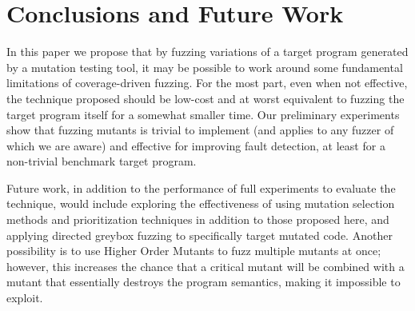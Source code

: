 \section{Conclusions and Future Work}

In this paper we propose that by fuzzing variations of a target program generated by a mutation testing tool, it may be possible to work around some fundamental limitations of coverage-driven fuzzing.  For the most part, even when not effective, the technique proposed should be low-cost and at worst equivalent to fuzzing the target program itself for a somewhat smaller time.  Our preliminary experiments show that fuzzing mutants is trivial to implement (and applies to any fuzzer of which we are aware) and effective for improving fault detection, at least for a non-trivial benchmark target program.

Future work, in addition to the performance of full experiments to evaluate the technique, would include exploring the effectiveness of using mutation selection methods and prioritization techniques in addition to those proposed here, and applying directed greybox fuzzing \cite{AFLGo} to specifically target mutated code.  Another possibility is to use Higher Order Mutants \cite{HOM} to fuzz multiple mutants at once; however, this increases the chance that a critical mutant will be combined with a mutant that essentially destroys the program semantics, making it impossible to exploit.
